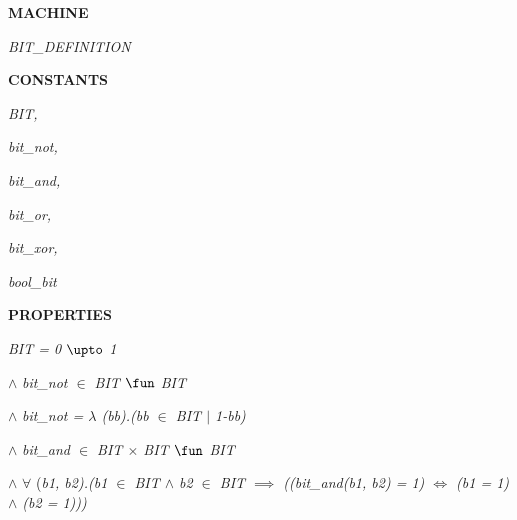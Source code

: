 
 

\bf MACHINE

\hspace*{0.20in}\it BIT\_DEFINITION

\vspace*{4mm}
\bf CONSTANTS

\hspace*{0.20in}\it BIT\rm ,

\hspace*{0.20in}\it bit\_not\rm ,

\hspace*{0.20in}\it bit\_and\rm ,

\hspace*{0.20in}\it bit\_or\rm ,

\hspace*{0.20in}\it bit\_xor\rm ,

\hspace*{0.20in}\it bool\_bit

\vspace*{4mm}
\bf PROPERTIES

\hspace*{0.20in}\it BIT \rm = \rm 0 $\upto$ \rm 1 

\hspace*{0.20in}

\hspace*{0.20in} $\land$  \it bit\_not  $\in$  \it BIT  $\fun$  \it BIT 

\hspace*{0.20in} $\land$  \it bit\_not \rm =  $\lambda$ \rm (\it bb\rm )\rm .\rm (\it bb $\in$ \it BIT  $\mid$  \rm 1\rm -\it bb\rm )

\hspace*{0.20in}

\hspace*{0.20in}

\hspace*{0.20in} $\land$  \it bit\_and  $\in$  \it BIT  $\times$  \it BIT  $\fun$  \it BIT 

\hspace*{0.20in} $\land$   $\forall$ \rm (\it b1\rm , \it b2\rm )\rm .\rm (\it b1  $\in$  \it BIT  $\land$  \it b2  $\in$  \it BIT  $\implies$  \rm (\rm (\it bit\_and\rm (\it b1\rm , \it b2\rm ) \rm = \rm 1\rm )  $\iff$  \rm (\it b1 \rm = \rm 1\rm )  $\land$  \rm (\it b2 \rm = \rm 1\rm )\rm )\rm )

\hspace*{0.20in} \hspace*{0.40in}


